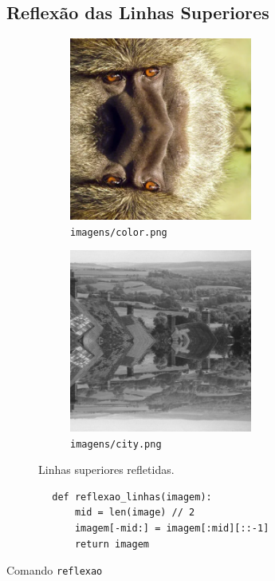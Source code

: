 \subsection{Reflexão das Linhas Superiores}

\begin{figure}[H]
    \centering
    \begin{subfigure}{0.45\textwidth}
        \centering
        \includegraphics[width=6cm]{resultados/colorrefl.png}
        \caption{\texttt{imagens/color.png}}
    \end{subfigure}%
    \begin{subfigure}{0.45\textwidth}
        \centering
        \includegraphics[width=6cm]{resultados/cityrefl.png}
        \caption{\texttt{imagens/city.png}}
    \end{subfigure}

    \caption{Linhas superiores refletidas.}
\end{figure}

\begin{listing}[H]
    \begin{verbatim}
        def reflexao_linhas(imagem):
            mid = len(image) // 2
            imagem[-mid:] = imagem[:mid][::-1]
            return imagem
    \end{verbatim}

    \caption{Comando \texttt{reflexao}}
\end{listing}
